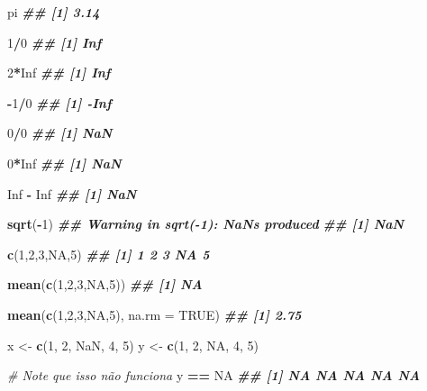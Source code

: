 \documentclass[
]{book}
\newenvironment{Shaded}{\begin{snugshade}}{\end{snugshade}}
\newcommand{\AttributeTok}[1]{\textcolor[rgb]{0.13,0.29,0.53}{#1}}
\newcommand{\CommentTok}[1]{\textcolor[rgb]{0.56,0.35,0.01}{\textit{#1}}}
\newcommand{\ConstantTok}[1]{\textcolor[rgb]{0.56,0.35,0.01}{#1}}
\newcommand{\DecValTok}[1]{\textcolor[rgb]{0.00,0.00,0.81}{#1}}
\newcommand{\DocumentationTok}[1]{\textcolor[rgb]{0.56,0.35,0.01}{\textbf{\textit{#1}}}}
\newcommand{\FunctionTok}[1]{\textcolor[rgb]{0.13,0.29,0.53}{\textbf{#1}}}
\newcommand{\NormalTok}[1]{#1}
\newcommand{\OtherTok}[1]{\textcolor[rgb]{0.56,0.35,0.01}{#1}}
\newcommand{\SpecialCharTok}[1]{\textcolor[rgb]{0.81,0.36,0.00}{\textbf{#1}}}
\begin{document}
\begin{Shaded}
\begin{Highlighting}[]
\NormalTok{pi}
\DocumentationTok{\#\# [1] 3.14}

\DecValTok{1}\SpecialCharTok{/}\DecValTok{0}  
\DocumentationTok{\#\# [1] Inf}

\DecValTok{2}\SpecialCharTok{*}\ConstantTok{Inf}
\DocumentationTok{\#\# [1] Inf}

\SpecialCharTok{{-}}\DecValTok{1}\SpecialCharTok{/}\DecValTok{0}
\DocumentationTok{\#\# [1] {-}Inf}

\DecValTok{0}\SpecialCharTok{/}\DecValTok{0}
\DocumentationTok{\#\# [1] NaN}

\DecValTok{0}\SpecialCharTok{*}\ConstantTok{Inf}
\DocumentationTok{\#\# [1] NaN}

\ConstantTok{Inf} \SpecialCharTok{{-}} \ConstantTok{Inf}
\DocumentationTok{\#\# [1] NaN}

\FunctionTok{sqrt}\NormalTok{(}\SpecialCharTok{{-}}\DecValTok{1}\NormalTok{)}
\DocumentationTok{\#\# Warning in sqrt({-}1): NaNs produced}
\DocumentationTok{\#\# [1] NaN}
    
\FunctionTok{c}\NormalTok{(}\DecValTok{1}\NormalTok{,}\DecValTok{2}\NormalTok{,}\DecValTok{3}\NormalTok{,}\ConstantTok{NA}\NormalTok{,}\DecValTok{5}\NormalTok{)}
\DocumentationTok{\#\# [1]  1  2  3 NA  5}

\FunctionTok{mean}\NormalTok{(}\FunctionTok{c}\NormalTok{(}\DecValTok{1}\NormalTok{,}\DecValTok{2}\NormalTok{,}\DecValTok{3}\NormalTok{,}\ConstantTok{NA}\NormalTok{,}\DecValTok{5}\NormalTok{))}
\DocumentationTok{\#\# [1] NA}

\FunctionTok{mean}\NormalTok{(}\FunctionTok{c}\NormalTok{(}\DecValTok{1}\NormalTok{,}\DecValTok{2}\NormalTok{,}\DecValTok{3}\NormalTok{,}\ConstantTok{NA}\NormalTok{,}\DecValTok{5}\NormalTok{), }\AttributeTok{na.rm =} \ConstantTok{TRUE}\NormalTok{)}
\DocumentationTok{\#\# [1] 2.75}
    
\NormalTok{x }\OtherTok{\textless{}{-}} \FunctionTok{c}\NormalTok{(}\DecValTok{1}\NormalTok{, }\DecValTok{2}\NormalTok{, }\ConstantTok{NaN}\NormalTok{, }\DecValTok{4}\NormalTok{, }\DecValTok{5}\NormalTok{)}
\NormalTok{y }\OtherTok{\textless{}{-}} \FunctionTok{c}\NormalTok{(}\DecValTok{1}\NormalTok{, }\DecValTok{2}\NormalTok{, }\ConstantTok{NA}\NormalTok{, }\DecValTok{4}\NormalTok{, }\DecValTok{5}\NormalTok{)}

\CommentTok{\# Note que isso não funciona}
\NormalTok{y }\SpecialCharTok{==} \ConstantTok{NA}
\DocumentationTok{\#\# [1] NA NA NA NA NA}


\end{Highlighting}
\end{Shaded}
\end{document}
